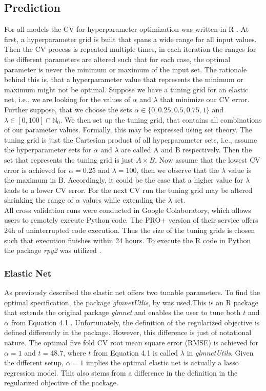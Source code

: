 \documentclass[a4paper,12pt, headsepline]{scrartcl}
\numberwithin{equation}{section}
\begin{document}
\subsection{Prediction}\label{subsec:pred}
For all models the CV for hyperparameter optimization was written in R \citep{R}. At first, a hyperparameter grid is built that spans a wide range for all input values. Then the CV process is repeated multiple times, in each iteration the ranges for the different parameters are altered such that for each case, the optimal parameter is never the minimum or maximum of the input set. The rationale behind this is, that a hyperparameter value that represents the minimum or maximum might not be optimal. Suppose we have a tuning grid for an elastic net, i.e., we are looking for the values of $\alpha$ and $\lambda$ that minimize our CV error. Further suppose, that we choose the sets $\alpha \in \{0, 0.25, 0.5, 0.75, 1\}$ and $\lambda \in [0, 100] \cap \mathbb{N}_0$. We then set up the tuning grid, that contains all combinations of our parameter values. Formally, this may be expressed using set theory. The tuning grid is just the Cartesian product of all hyperparameter sets, i.e., assume the hyperparameter sets for $\alpha$ and $\lambda$ are called A and B respectively. Then the set that represents the tuning grid is just $A \times B$. Now assume that the lowest CV error is achieved for $\alpha = 0.25$ and $\lambda = 100$, then we observe that the $\lambda$ value is the maximum in B. Accordingly, it could be the case that a higher value for $\lambda$ leads to a lower CV error. For the next CV run the tuning grid may be altered shrinking the range of $\alpha$ values while extending the $\lambda$ set.\\
All cross validation runs were conducted in Google Colaboratory, which allows users to remotely execute Python code. The PRO+ version of their service offers 24h of uninterrupted code execution. Thus the size of the tuning grids is chosen such that execution finishes within 24 hours. To execute the R code in Python the package \textit{rpy2} was utilized \citep{rpy2}.

\subsubsection{Elastic Net}
As previously described the elastic net offers two tunable parameters. To find the optimal specification, the package \textit{glmnetUtlis}, by \citet{glmnetUtils} was used.This is an R package that extends the original package \textit{glmnet} and enables the user to tune both $t$ and $\alpha$ from Equation 4.1 \citep{glmnet}. Unfortunately, the definition of the regularized objective is defined differently in the package. However, this difference is just of notational nature. The optimal five fold CV root mean square error (RMSE) is achieved for $\alpha = 1$ and $t = 48.7$, where $t$ from Equation 4.1 is called $\lambda$ in \textit{glmnetUtils}. Given the different setup, $\alpha = 1$ implies the optimal elastic net is actually a lasso regression model. This also stems from a difference in the definition in the regularized objective of the package. 
\end{document}
